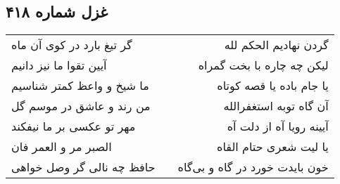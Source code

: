 \begin{center}
\section*{غزل شماره ۴۱۸}
\label{sec:sh418}
\begin{longtable}{l p{0.5cm} r}
گر تیغ بارد در کوی آن ماه
&&
گردن نهادیم الحکم لله
\\
آیین تقوا ما نیز دانیم
&&
لیکن چه چاره با بخت گمراه
\\
ما شیخ و واعظ کمتر شناسیم
&&
یا جام باده یا قصه کوتاه
\\
من رند و عاشق در موسم گل
&&
آن گاه توبه استغفرالله
\\
مهر تو عکسی بر ما نیفکند
&&
آیینه رویا آه از دلت آه
\\
الصبر مر و العمر فان
&&
یا لیت شعری حتام القاه
\\
حافظ چه نالی گر وصل خواهی
&&
خون بایدت خورد در گاه و بی‌گاه
\\
\end{longtable}
\end{center}
